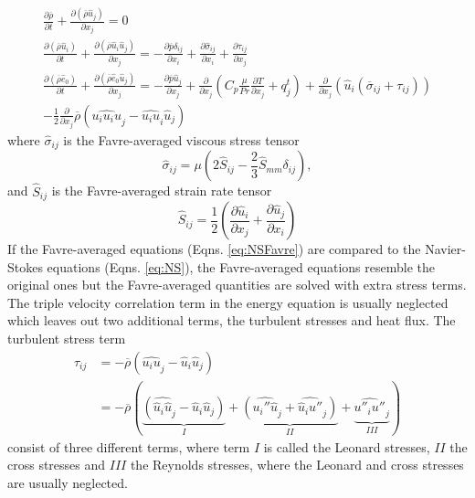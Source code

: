 \begin{equation} 
  \label{eq:NSFavre}
  \begin{gathered}
    \frac{\partial \overline{\rho}}{\partial t} + \frac{\partial \left(\overline{\rho} \hat{u}_j \right)}{\partial x_j} = 0 \\
    \frac{\partial \left( \overline{\rho} \hat{u}_i \right)}{\partial t} + \frac{\partial\left(\overline{\rho} \hat{u}_i \hat{u}_j \right)}{\partial x_j} = -\frac{\partial \overline{p}\delta _{ij}}{\partial x_i} + \frac{\partial \hat{\sigma} _{ij}}{\partial x_i}+\frac{\partial \tau _{ij}}{\partial x_j} \\
    \frac{\partial \left( \overline{\rho} \hat{e}_0\right)}{\partial t} + \frac{\partial \left(\overline{\rho} \hat{e}_0 \hat{u}_j\right)}{\partial x_j}= -\frac{\partial \overline{p}\hat{u}_j}{\partial x_j}+\frac{\partial}{\partial x_j}\left(C_p\frac{\mu}{Pr}\frac{\partial {T}}{\partial x_j}+q_j^t\right)+\frac{\partial}{\partial x_j}\left(\hat{u}_i\left(\overline{\sigma} _{ij} + \tau_{ij}\right)\right)\\
    -\frac{1}{2}\frac{\partial}{\partial x_j}\overline{\rho}\left(\widehat{u_iu_iu}_j-\widehat{u_iu}_i\hat{u}_j\right)
  \end{gathered}
\end{equation}
where $\hat{\sigma} _{ij}$ is the Favre-averaged viscous stress tensor
\begin{equation}
  \hat{\sigma} _{ij} = \mu \left(2\hat{S}_{ij}-\frac{2}{3}\hat{S}_{mm}\delta _{ij}\right),
\end{equation}
and $\hat{S}_{ij}$ is the Favre-averaged strain rate tensor
\begin{equation}
  \hat{S}_{ij}=\frac{1}{2}\left(\frac{\partial \hat{u}_i}{\partial x_j}+\frac{\partial \hat{u}_j}{\partial x_i}\right)
\end{equation}
If the Favre-averaged equations (Eqns. \ref{eq:NSFavre}) are compared to the Navier-Stokes equations (Eqns. \ref{eq:NS}), the Favre-averaged equations resemble the original ones but the Favre-averaged quantities are solved with extra stress terms. The triple velocity correlation term in the energy equation is usually neglected which leaves out two additional terms, the turbulent stresses and heat flux. The turbulent stress term 
\begin{equation}
  \begin{aligned}
    \tau _{ij}  &= -\overline{\rho}\left(\widehat{u_iu}_j-\hat{u}_i\hat{u}_j\right)\\
                &= -\overline{\rho}\left(\underbrace{\left(\widehat{\hat{u}_i\hat{u}}_j-\hat{u}_i\hat{u}_j\right)}_I+\underbrace{\left(\widehat{u_i''\hat{u}}_j+\widehat{\hat{u}_iu''}_j\right)}_{II}+\underbrace{\widehat{u''_iu''}_j}_{III}\right)
  \end{aligned}
\end{equation}
consist of three different terms, where term $I$ is called the Leonard stresses, $II$ the cross stresses and $III$ the Reynolds stresses, where the Leonard and cross stresses are usually neglected. 


